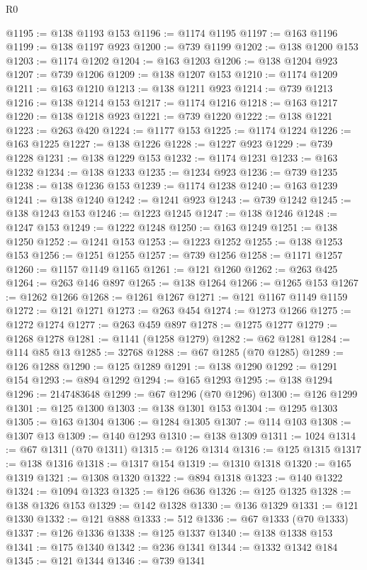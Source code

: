 \begin{lexlean}{R0}
\begin{coremodule}
@1195 := @138 @1193 @153
@1196 := @1174 @1195
@1197 := @163 @1196
@1199 := @138 @1197 @923
@1200 := @739 @1199
@1202 := @138 @1200 @153
@1203 := @1174 @1202
@1204 := @163 @1203
@1206 := @138 @1204 @923
@1207 := @739 @1206
@1209 := @138 @1207 @153
@1210 := @1174 @1209
@1211 := @163 @1210
@1213 := @138 @1211 @923
@1214 := @739 @1213
@1216 := @138 @1214 @153
@1217 := @1174 @1216
@1218 := @163 @1217
@1220 := @138 @1218 @923
@1221 := @739 @1220
@1222 := @138 @1221
@1223 := @263 @420
@1224 := @1177 @153
@1225 := @1174 @1224
@1226 := @163 @1225
@1227 := @138 @1226
@1228 := @1227 @923
@1229 := @739 @1228
@1231 := @138 @1229 @153
@1232 := @1174 @1231
@1233 := @163 @1232
@1234 := @138 @1233
@1235 := @1234 @923
@1236 := @739 @1235
@1238 := @138 @1236 @153
@1239 := @1174 @1238
@1240 := @163 @1239
@1241 := @138 @1240
@1242 := @1241 @923
@1243 := @739 @1242
@1245 := @138 @1243 @153
@1246 := @1223 @1245
@1247 := @138 @1246
@1248 := @1247 @153
@1249 := @1222 @1248
@1250 := @163 @1249
@1251 := @138 @1250
@1252 := @1241 @153
@1253 := @1223 @1252
@1255 := @138 @1253 @153
@1256 := @1251 @1255
@1257 := @739 @1256
@1258 := @1171 @1257
@1260 := @1157 @1149 @1165
@1261 := @121 @1260
@1262 := @263 @425
@1264 := @263 @146 @897
@1265 := @138 @1264
@1266 := @1265 @153
@1267 := @1262 @1266
@1268 := @1261 @1267
@1271 := @121 @1167 @1149 @1159
@1272 := @121 @1271
@1273 := @263 @454
@1274 := @1273 @1266
@1275 := @1272 @1274
@1277 := @263 @459 @897
@1278 := @1275 @1277
@1279 := @1268 @1278
@1281 := @1141 (@1258 @1279)
@1282 := @62 @1281
@1284 := @114 @85 @13
@1285 := 32768
@1288 := @67 @1285 (@70 @1285)
@1289 := @126 @1288
@1290 := @125 @1289
@1291 := @138 @1290
@1292 := @1291 @154
@1293 := @894 @1292
@1294 := @165 @1293
@1295 := @138 @1294
@1296 := 2147483648
@1299 := @67 @1296 (@70 @1296)
@1300 := @126 @1299
@1301 := @125 @1300
@1303 := @138 @1301 @153
@1304 := @1295 @1303
@1305 := @163 @1304
@1306 := @1284 @1305
@1307 := @114 @103
@1308 := @1307 @13
@1309 := @140 @1293
@1310 := @138 @1309
@1311 := 1024
@1314 := @67 @1311 (@70 @1311)
@1315 := @126 @1314
@1316 := @125 @1315
@1317 := @138 @1316
@1318 := @1317 @154
@1319 := @1310 @1318
@1320 := @165 @1319
@1321 := @1308 @1320
@1322 := @894 @1318
@1323 := @140 @1322
@1324 := @1094 @1323
@1325 := @126 @636
@1326 := @125 @1325
@1328 := @138 @1326 @153
@1329 := @142 @1328
@1330 := @136 @1329
@1331 := @121 @1330
@1332 := @121 @888
@1333 := 512
@1336 := @67 @1333 (@70 @1333)
@1337 := @126 @1336
@1338 := @125 @1337
@1340 := @138 @1338 @153
@1341 := @175 @1340
@1342 := @236 @1341
@1344 := @1332 @1342 @184
@1345 := @121 @1344
@1346 := @739 @1341

\end{coremodule}
\end{lexlean}
